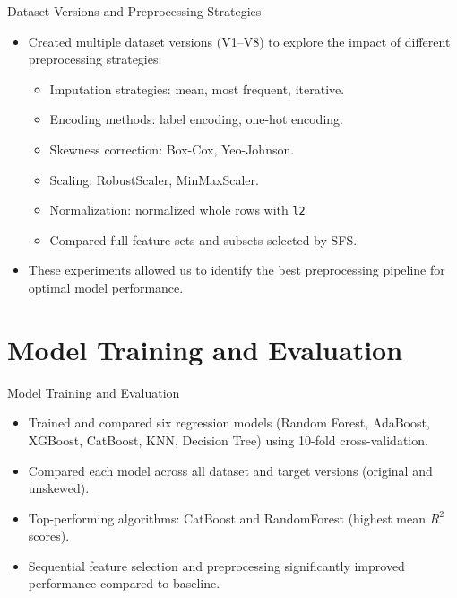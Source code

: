\documentclass{beamer}
\begin{document}
\begin{frame}{Dataset Versions and Preprocessing Strategies}
        \begin{itemize}
                \item Created multiple dataset versions (V1–V8) to explore the
                        impact of different preprocessing strategies:
                        \begin{itemize}
                                \item Imputation strategies: mean, most
                                        frequent, iterative.
                                \item Encoding methods: label encoding, one-hot
                                        encoding.
                                \item Skewness correction: Box-Cox,
                                        Yeo-Johnson.
                                \item Scaling: RobustScaler, MinMaxScaler.
                                \item Normalization: normalized whole rows with
                                        \texttt{l2}
                                \item Compared full feature sets and subsets
                                        selected by SFS.
                        \end{itemize}
                \item These experiments allowed us to identify the best
                        preprocessing pipeline for optimal model performance.
        \end{itemize}
\end{frame}

\section{Model Training and Evaluation}
\begin{frame}{Model Training and Evaluation}
        \begin{itemize}
                \item Trained and compared six regression models (Random
                        Forest, AdaBoost, XGBoost, CatBoost, KNN, Decision
                        Tree) using 10-fold cross-validation.
                \item Compared each model across all dataset and target
                        versions (original and unskewed).
                \item Top-performing algorithms: CatBoost and RandomForest
                        (highest mean $R^2$ scores).
                \item Sequential feature selection and preprocessing
                        significantly improved performance compared to
                        baseline.
        \end{itemize}
\end{frame}
\end{document}
